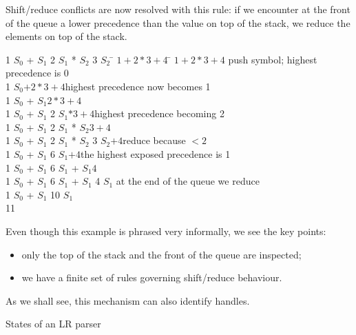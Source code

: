 Shift/reduce conflicts are now resolved with this rule: if we
encounter at the front of the queue a lower precedence than the value
on top of the stack, we reduce the elements on top of the stack.
\begin{tabbing}
1 $S_0$ + $S_1$ 2 $S_1$ * $S_2$ 3 $S_2$ \hskip1cm\= $1+2*3+4$ \=\kill
\>$1+2*3+4$\> push symbol; highest precedence is 0\\
1 $S_0$\>$+2*3+4$\>highest precedence now becomes 1\\
1 $S_0$ + $S_1$\>$2*3+4$\\
1 $S_0$ + $S_1$ 2 $S_1$\>$*3+4$\>highest precedence becoming 2\\
1 $S_0$ + $S_1$ 2 $S_1$ * $S_2$\>$3+4$\\
1 $S_0$ + $S_1$ 2 $S_1$ * $S_2$ 3 $S_2$\>$+4$\>reduce because ${}<2$\\
1 $S_0$ + $S_1$ 6 $S_1$\>$+4$\>the highest exposed precedence is 1\\
1 $S_0$ + $S_1$ 6 $S_1$ + $S_1$\>$4$\\
1 $S_0$ + $S_1$ 6 $S_1$ + $S_1$ 4 $S_1$ \>\>at the end of the queue we reduce\\
1 $S_0$ + $S_1$ 10 $S_1$ \\
11
\end{tabbing}
Even though this example is phrased very informally, we see the key
points:
\begin{itemize}
\item only the top of the stack and the front of the queue are
  inspected;
\item we have a finite set of rules governing shift/reduce behaviour.
\end{itemize}
As we shall see, this mechanism can also identify handles.

 {States of an LR parser}

